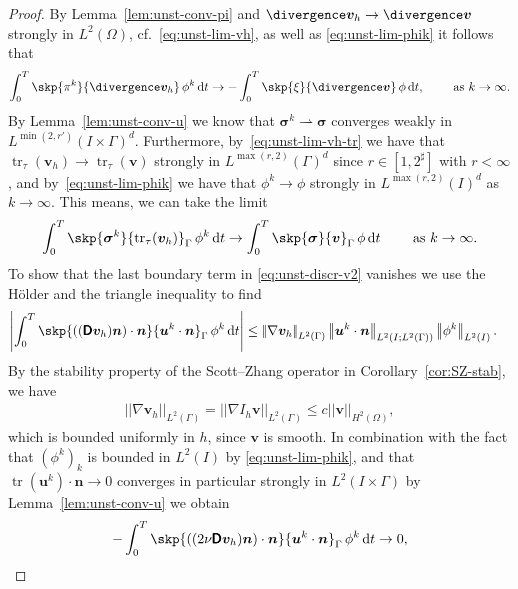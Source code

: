 \documentclass[reqno,a4paper]{amsart}
\def\abs#1{\left| #1 \right|}
\def\norm#1{\left|\!\left| #1 \right|\!\right|}
\def\tens#1{\pmb{\mathsf{#1}}}
\def\vec#1{\boldsymbol{#1}}
\def\tr{\mathop{\mathrm{tr}}\nolimits}
\def\d{{\rm d}}
\def\dt{\,\d t}
\def\wconv{\rightharpoonup}
\def\bn{\vec{n}}
\def\bu{\vec{u}}
\def\bv{\vec{v}}
\def\bsigma{\vec{\sigma}}
\def\BD{\tens{D}}
\def\PiSZ{{I_h}}
\begin{document}
\begin{proof}
	By Lemma~\ref{lem:unst-conv-pi} and $\divergence \bv_h \to \divergence \bv$ strongly in $L^2(\Omega)$, cf.~\eqref{eq:unst-lim-vh}, as well as \eqref{eq:unst-lim-phik} it follows that 
	\begin{align} \label{eq:unst-lim-4}
		\int_0^T  \skp{\pi^k }{\divergence \bv_h} \, \phi^k \dt \to  
		- \int_0^T  \skp{\xi}{\divergence \bv} \,\phi \dt,  
		\qquad \text{ as } k \to \infty. 
	\end{align}
	By Lemma~\ref{lem:unst-conv-u} we know that $\bsigma^k \wconv \bsigma $ converges weakly in $L^{\min(2,r')}(I \times \Gamma)^d$. 
	Furthermore, by~\eqref{eq:unst-lim-vh-tr} we have that $\tr_\tau(\bv_h) \to \tr_{\tau}(\bv)$ strongly in $L^{\max(r,2)}(\Gamma)^d$ since 
	$r \in [1,2^\sharp]$ with $r < \infty$, and by~\eqref{eq:unst-lim-phik} we have that $\phi^k \to \phi$ strongly in $L^{\max(r,2)}(I)^d$ as $k \to \infty$. 
	This means, we can take the limit 
	\begin{align}\label{eq:unst-lim-5}
		\int_0^T \skp{\bsigma^k}{\tr_\tau(\bv_h)}_{\Gamma} \, \phi^k \dt  \to 
		\int_0^T \skp{\bsigma}{\bv}_{\Gamma} \, \phi \dt 	\qquad \text{ as } k \to \infty. 
	\end{align}
	To show that the last boundary term in \eqref{eq:unst-discr-v2} vanishes we use the Hölder and the triangle inequality to find
	\begin{equation}\label{eq:unst-lim-7a}
		\begin{aligned}
			\abs{\int_{0}^T  \skp{  \left(( \BD \bv_h) \bn \right) \cdot \bn }{ \bu^{k} \cdot \bn }_{\Gamma} \,\phi^k \dt}  
			&\leq 
			\norm{\nabla \bv_h}_{L^2(\Gamma)} \norm{\bu^k \cdot \bn}_{L^2(I;L^2(\Gamma))} \norm{\phi^k}_{L^2(I)}. 
		\end{aligned}
	\end{equation}
	By the stability property of the Scott--Zhang operator in Corollary~\ref{cor:SZ-stab}, we have  
	\begin{align}\label{est:unst-stab}
		\norm{\nabla \bv_h}_{L^2(\Gamma)}  = \norm{\nabla \PiSZ \bv }_{L^2(\Gamma)} \leq c \norm{\bv}_{H^2(\Omega)},
	\end{align}
	which is bounded uniformly in $h$, since $\bv$ is smooth.  
	In combination with the fact that $(\phi^k)_{k}$ is bounded in $L^2(I)$ by \eqref{eq:unst-lim-phik}, and that 
	$\tr(\bu^k) \cdot \bn \to 0$ converges in particular strongly in $L^2(I\times \Gamma)$ by Lemma~\ref{lem:unst-conv-u} we obtain 
	\begin{align}\label{eq:unst-lim-7}
		- \int_0^T \skp{   \left((2 \nu \BD \bv_h) \bn \right) \cdot \bn }{ \bu^{k} \cdot \bn }_{\Gamma}\, \phi^k \dt \to 0,

\end{align}
\end{proof}
\end{document}

